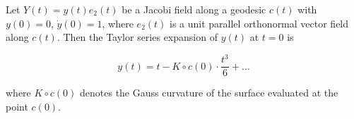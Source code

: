 Let $Y(t) = y(t)e_2(t)$ be a Jacobi field along a geodesic $c(t)$ with $y(0) = 0$, $\dot{y}(0) = 1$, where $e_2(t)$ is a unit parallel orthonormal vector field along $c(t)$. Then the Taylor series expansion of $y(t)$ at $t = 0$ is

$$y(t) = t - K \circ c(0) \cdot \frac{t^3}{6} + \dots$$

where $K \circ c(0)$ denotes the Gauss curvature of the surface evaluated at the point $c(0)$.
